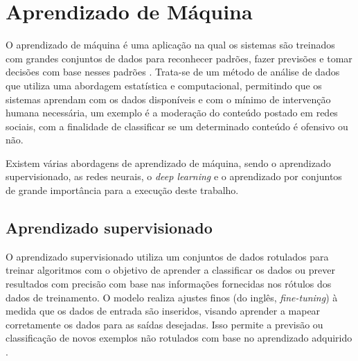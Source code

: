 \section{Aprendizado de Máquina}

O aprendizado de máquina é uma aplicação na qual os sistemas são treinados com grandes conjuntos de dados para reconhecer padrões, fazer previsões e tomar decisões com base nesses padrões \cite{HoschMachineLearning}. Trata-se de um método de análise de dados que utiliza uma abordagem estatística e computacional, permitindo que os sistemas aprendam com os dados disponíveis e com o mínimo de intervenção humana necessária, um exemplo é a moderação do conteúdo postado em redes sociais, com a finalidade de classificar se um determinado conteúdo é ofensivo ou não.




Existem várias abordagens de aprendizado de máquina, sendo o aprendizado supervisionado, as redes neurais, o \textit{deep learning} e o aprendizado por conjuntos de grande importância para a execução deste trabalho.

\subsection{Aprendizado supervisionado}

O aprendizado supervisionado utiliza um conjuntos de dados rotulados para treinar algoritmos com o objetivo de aprender a classificar os dados ou prever resultados com precisão com base nas informações fornecidas nos rótulos dos dados de treinamento. O modelo realiza ajustes finos (do inglês, \textit{fine-tuning}) à medida que os dados de entrada são inseridos, visando aprender a mapear corretamente os dados para as saídas desejadas. Isso permite a previsão ou classificação de novos exemplos não rotulados com base no aprendizado adquirido \cite{RussellNorvig1995}.

